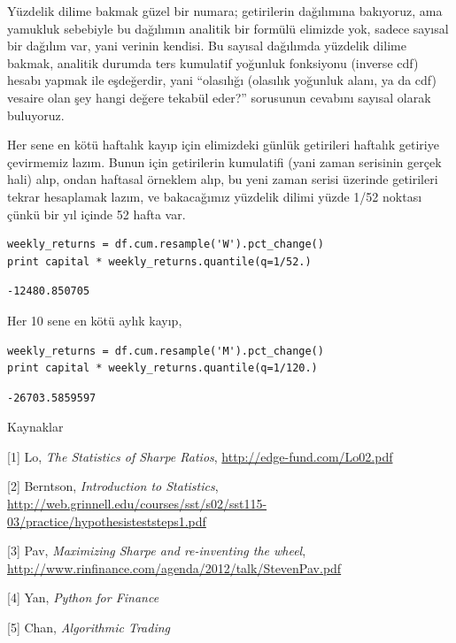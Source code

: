 \documentclass[12pt,fleqn]{article}\usepackage{../../common}
\begin{document}
Yüzdelik dilime bakmak güzel bir numara; getirilerin dağılımına bakıyoruz, ama
yamukluk sebebiyle bu dağılımın analitik bir formülü elimizde yok, sadece
sayısal bir dağılım var, yani verinin kendisi. Bu sayısal dağılımda yüzdelik
dilime bakmak, analitik durumda ters kumulatif yoğunluk fonksiyonu (inverse cdf)
hesabı yapmak ile eşdeğerdir, yani ``olasılığı (olasılık yoğunluk alanı, ya da
cdf) vesaire olan şey hangi değere tekabül eder?'' sorusunun cevabını sayısal
olarak buluyoruz.

Her sene en kötü haftalık kayıp için elimizdeki günlük getirileri haftalık
getiriye çevirmemiz lazım. Bunun için getirilerin kumulatifi (yani zaman
serisinin gerçek hali) alıp, ondan haftasal örneklem alıp, bu yeni zaman serisi
üzerinde getirileri tekrar hesaplamak lazım, ve bakacağımız yüzdelik dilimi
yüzde 1/52 noktası çünkü bir yıl içinde 52 hafta var.

\begin{verbatim}
weekly_returns = df.cum.resample('W').pct_change()
print capital * weekly_returns.quantile(q=1/52.)
\end{verbatim}

\begin{verbatim}
-12480.850705
\end{verbatim}

Her 10 sene en kötü aylık kayıp,

\begin{verbatim}
weekly_returns = df.cum.resample('M').pct_change()
print capital * weekly_returns.quantile(q=1/120.)
\end{verbatim}

\begin{verbatim}
-26703.5859597
\end{verbatim}

Kaynaklar

[1] Lo, {\em The Statistics of Sharpe Ratios}, \url{http://edge-fund.com/Lo02.pdf}

[2] Berntson, {\em Introduction to Statistics}, \url{http://web.grinnell.edu/courses/sst/s02/sst115-03/practice/hypothesisteststeps1.pdf}

[3] Pav, {\em Maximizing Sharpe and re-inventing the wheel}, \url{http://www.rinfinance.com/agenda/2012/talk/StevenPav.pdf}

[4] Yan, {\em Python for Finance}

[5] Chan, {\em Algorithmic Trading}
\end{document}
